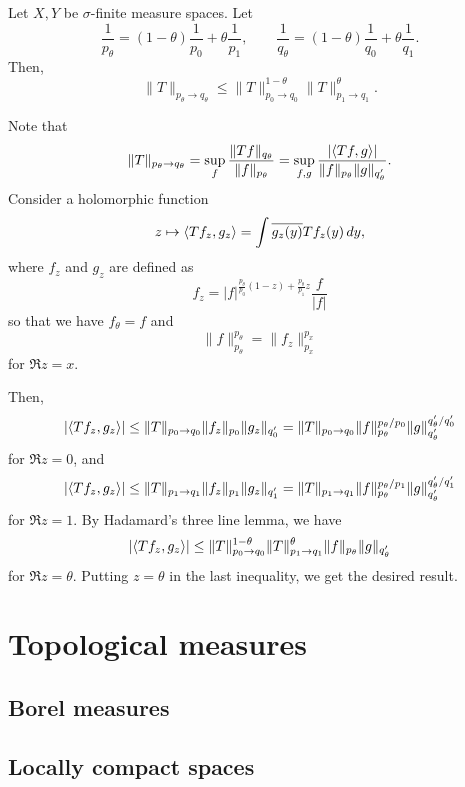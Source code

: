 \documentclass{../../large}
\begin{document}
\begin{prb}
Let $X,Y$ be $\sigma$-finite measure spaces.
Let
\[\frac1{p_\theta}=(1-\theta)\frac1{p_0}+\theta\frac1{p_1},\qquad\frac1{q_\theta}=(1-\theta)\frac1{q_0}+\theta\frac1{q_1}.\]
Then,
\[\|T\|_{p_\theta\to q_\theta}\le\|T\|_{p_0\to q_0}^{1-\theta}\|T\|_{p_1\to q_1}^\theta.\]
\end{prb}
\begin{pf}
Note that
\[\|T\|_{p_\theta\to q_\theta}=\sup_f\frac{\|Tf\|_{q_\theta}}{\|f\|_{p_\theta}}=\sup_{f,g}\frac{|\langle Tf,g\rangle|}{\|f\|_{p_\theta}\|g\|_{q'_\theta}}.\]
Consider a holomorphic function
\[z\mapsto\langle Tf_z,g_z\rangle=\int\overline{g_z(y)}Tf_z(y)\,dy,\]
where $f_z$ and $g_z$ are defined as
\[f_z=|f|^{\frac{p_\theta}{p_0}(1-z)+\frac{p_\theta}{p_1}z}\frac f{|f|}\]
so that we have $f_\theta=f$ and
\[\|f\|_{p_\theta}^{p_\theta}=\|f_z\|_{p_x}^{p_x}\]
for $\Re z=x$.

Then,
\[|\langle Tf_z,g_z\rangle|\le\|T\|_{p_0\to q_0}\|f_z\|_{p_0}\|g_z\|_{q'_0}=\|T\|_{p_0\to q_0}\|f\|_{p_\theta}^{p_\theta/p_0}\|g\|_{q'_\theta}^{q'_\theta/q'_0}\]
for $\Re z=0$, and
\[|\langle Tf_z,g_z\rangle|\le\|T\|_{p_1\to q_1}\|f_z\|_{p_1}\|g_z\|_{q'_1}=\|T\|_{p_1\to q_1}\|f\|_{p_\theta}^{p_\theta/p_1}\|g\|_{q'_\theta}^{q'_\theta/q'_1}\]
for $\Re z=1$.
By Hadamard's three line lemma, we have
\[|\langle Tf_z,g_z\rangle|\le\|T\|_{p_0\to q_0}^{1-\theta}\|T\|_{p_1\to q_1}^\theta\|f\|_{p_\theta}\|g\|_{q'_\theta}\]
for $\Re z=\theta$.
Putting $z=\theta$ in the last inequality, we get the desired result.
\end{pf}






\chapter{Topological measures}

\section{Borel measures}



\section{Locally compact spaces}



\begin{prb}
\end{prb}
\end{document}

